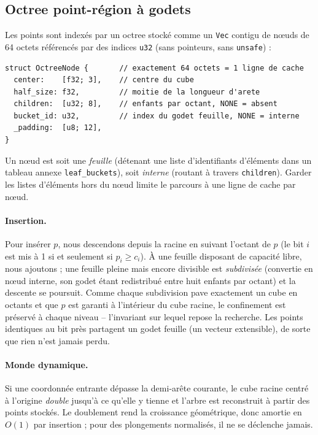 \documentclass[11pt]{article}
\begin{document}
\subsection{Octree point-région à godets}
Les points sont indexés par un octree stocké comme un \texttt{Vec} contigu de n\oe{}uds
de 64 octets référencés par des indices \texttt{u32} (sans pointeurs, sans
\texttt{unsafe}) :
\begin{lstlisting}
struct OctreeNode {       // exactement 64 octets = 1 ligne de cache
  center:    [f32; 3],    // centre du cube
  half_size: f32,         // moitie de la longueur d'arete
  children:  [u32; 8],    // enfants par octant, NONE = absent
  bucket_id: u32,         // index du godet feuille, NONE = interne
  _padding:  [u8; 12],
}
\end{lstlisting}
Un n\oe{}ud est soit une \emph{feuille} (détenant une liste d'identifiants d'éléments
dans un tableau annexe \texttt{leaf\_buckets}), soit \emph{interne} (routant à travers
\texttt{children}). Garder les listes d'éléments hors du n\oe{}ud limite le parcours à
une ligne de cache par n\oe{}ud.

\paragraph{Insertion.} Pour insérer $p$, nous descendons depuis la racine en suivant
l'octant de $p$ (le bit $i$ est mis à 1 si et seulement si $p_i \ge c_i$). À une
feuille disposant de capacité libre, nous ajoutons ; une feuille pleine mais encore
divisible est \emph{subdivisée} (convertie en n\oe{}ud interne, son godet étant
redistribué entre huit enfants par octant) et la descente se poursuit. Comme chaque
subdivision pave exactement un cube en octants et que $p$ est garanti à l'intérieur du
cube racine, le confinement est préservé à chaque niveau -- l'invariant sur lequel
repose la recherche. Les points identiques au bit près partagent un godet feuille (un
vecteur extensible), de sorte que rien n'est jamais perdu.

\paragraph{Monde dynamique.} Si une coordonnée entrante dépasse la demi-arête
courante, le cube racine centré à l'origine \emph{double} jusqu'à ce qu'elle y tienne
et l'arbre est reconstruit à partir des points stockés. Le doublement rend la
croissance géométrique, donc amortie en $O(1)$ par insertion ; pour des plongements
normalisés, il ne se déclenche jamais.
\end{document}
